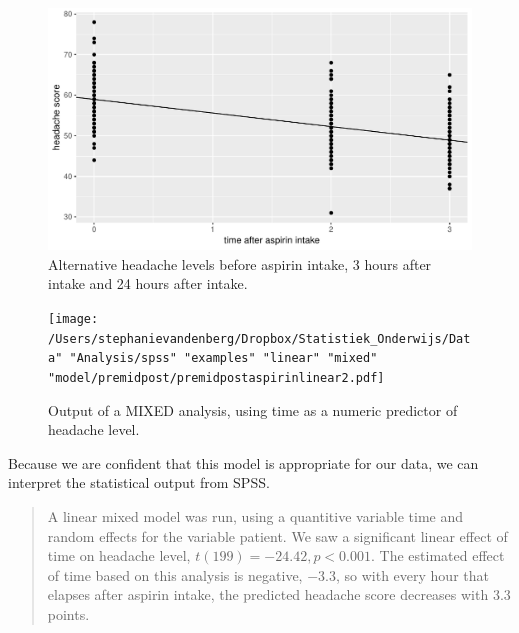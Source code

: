 \documentclass[]{book}\usepackage[]{graphicx}\usepackage[]{color}
\makeatletter
\def\maxwidth{ %
  \ifdim\Gin@nat@width>\linewidth
    \linewidth
  \else
    \Gin@nat@width
  \fi
}
\newenvironment{knitrout}{}{} %
\makeatother
\begin{document}
\begin{knitrout}
\color{fgcolor}\begin{figure}

{\centering \includegraphics[width=\maxwidth]{figure/analysispremidpost6-1} 

}

\caption[Alternative headache levels before aspirin intake, 3 hours after intake and 24 hours after intake]{Alternative headache levels before aspirin intake, 3 hours after intake and 24 hours after intake.}\label{fig:analysispremidpost6}
\end{figure}


\end{knitrout}



\begin{figure}[h]
    \begin{center}
       \texttt{[image: /Users/stephanievandenberg/Dropbox/Statistiek\_Onderwijs/Data" "Analysis/spss" "examples" "linear" "mixed" "model/premidpost/premidpostaspirinlinear2.pdf]}
    \end{center}
    \label{fig:premidpostaspirinlinear2}
    \caption{Output of a MIXED analysis, using time as a numeric predictor of headache level.}
\end{figure}


Because we are confident that this model is appropriate for our data, we can interpret the statistical output from SPSS. 

\begin{quotation}
A linear mixed model was run, using a quantitive variable time and random effects for the variable patient. We saw a significant linear effect of time on headache level, $t(199)=-24.42, p < 0.001$. The estimated effect of time based on this analysis is negative, $-3.3$, so with every hour that elapses after aspirin intake, the predicted headache score decreases with 3.3 points. 
\end{quotation}
\end{document}
